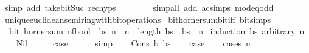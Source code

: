 \begin{isabellebody}
\ {\isacharparenleft}{\kern0pt}simp\ add{\isacharcolon}{\kern0pt}\ take{\isacharunderscore}{\kern0pt}bit{\isacharunderscore}{\kern0pt}Suc\ rec{\isachardot}{\kern0pt}hyps{\isacharparenright}{\kern0pt}\isanewline
\ \ \ \ \ \ \ \ {\isacharparenleft}{\kern0pt}simp{\isacharunderscore}{\kern0pt}all\ add{\isacharcolon}{\kern0pt}\ ac{\isacharunderscore}{\kern0pt}simps\ mod{\isacharunderscore}{\kern0pt}{}{\isacharunderscore}{\kern0pt}eq{\isacharunderscore}{\kern0pt}odd{\isacharparenright}{\kern0pt}\isanewline
\ \ \isamarkupfalse%
\isanewline
{}\isamarkupfalse%
%
\endisatagproof
{\isafoldproof}%
%
\isadelimproof
\isanewline
%
\endisadelimproof
\isanewline
{}\isamarkupfalse%
\isanewline
\isanewline
{}\isamarkupfalse%
\ unique{\isacharunderscore}{\kern0pt}euclidean{\isacharunderscore}{\kern0pt}semiring{\isacharunderscore}{\kern0pt}with{\isacharunderscore}{\kern0pt}bit{\isacharunderscore}{\kern0pt}operations\isanewline
{}\isanewline
\isanewline
{}\isamarkupfalse%
\ bit{\isacharunderscore}{\kern0pt}horner{\isacharunderscore}{\kern0pt}sum{\isacharunderscore}{\kern0pt}bit{\isacharunderscore}{\kern0pt}iff\ {\isacharbrackleft}{\kern0pt}bit{\isacharunderscore}{\kern0pt}simps{\isacharbrackright}{\kern0pt}{\isacharcolon}{\kern0pt}\isanewline
\ \ {\isacartoucheopen}bit\ {\isacharparenleft}{\kern0pt}horner{\isacharunderscore}{\kern0pt}sum\ of{\isacharunderscore}{\kern0pt}bool\ {}\ bs{\isacharparenright}{\kern0pt}\ n\ {\isasymlongleftrightarrow}\ n\ {\isacharless}{\kern0pt}\ length\ bs\ {\isasymand}\ bs\ {\isacharbang}{\kern0pt}\ n{\isacartoucheclose}\isanewline
%
\isadelimproof
%
\endisadelimproof
%
\isatagproof
{}\isamarkupfalse%
\ {\isacharparenleft}{\kern0pt}induction\ bs\ arbitrary{\isacharcolon}{\kern0pt}\ n{\isacharparenright}{\kern0pt}\isanewline
\ \ \isamarkupfalse%
\ Nil\isanewline
\ \ \isamarkupfalse%
\ \isamarkupfalse%
\ {\isacharquery}{\kern0pt}case\isanewline
\ \ \ \ \isamarkupfalse%
\ simp\isanewline
{}\isamarkupfalse%
\isanewline
\ \ \isamarkupfalse%
\ {\isacharparenleft}{\kern0pt}Cons\ b\ bs{\isacharparenright}{\kern0pt}\isanewline
\ \ \isamarkupfalse%
\ {\isacharquery}{\kern0pt}case\isanewline
\ \ \isamarkupfalse%
\ {\isacharparenleft}{\kern0pt}cases\ n{\isacharparenright}{\kern0pt}\isanewline
\ \ \ \ \isamarkupfalse%
\ {}\isanewline
\ \ \ \ \isamarkupfalse%

\end{isabellebody}
